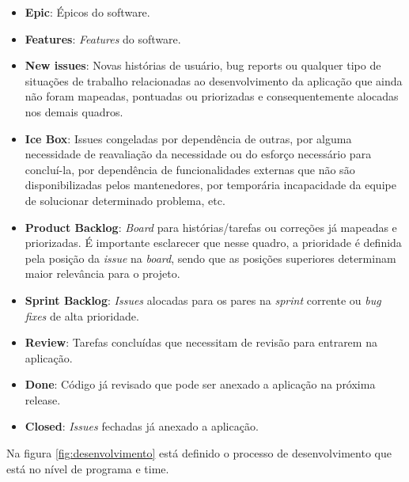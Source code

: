 \begin{itemize}
  \item \textbf{Epic}: Épicos do software.
  \item \textbf{Features}: \textit{Features} do software.
  \item \textbf{New issues}: Novas histórias de usuário, bug reports ou qualquer tipo de situações de trabalho relacionadas ao desenvolvimento da aplicação que ainda não foram mapeadas, pontuadas ou priorizadas e consequentemente alocadas nos demais quadros.
  \item \textbf{Ice Box}: Issues congeladas por dependência de outras, por alguma necessidade de reavaliação da necessidade ou do esforço necessário para concluí-la, por dependência de funcionalidades externas que não são disponibilizadas pelos mantenedores, por temporária incapacidade da equipe de solucionar determinado problema, etc.
  \item \textbf{Product Backlog}: \textit{Board} para histórias/tarefas ou correções já mapeadas e priorizadas. É importante esclarecer que nesse quadro, a prioridade é definida pela posição da \textit{issue} na \textit{board}, sendo que as posições superiores determinam maior relevância para o projeto.
  \item \textbf{Sprint Backlog}: \textit{Issues} alocadas para os pares na \textit{sprint} corrente ou \textit{bug fixes} de alta prioridade.
  \item \textbf{Review}: Tarefas concluídas que necessitam de revisão para entrarem na aplicação.
  \item \textbf{Done}: Código já revisado que pode ser anexado a aplicação na próxima release.
  \item \textbf{Closed}: \textit{Issues} fechadas já anexado a aplicação.
\end{itemize}

Na figura \ref{fig:desenvolvimento} está definido o processo de desenvolvimento que está no nível de programa e time.

